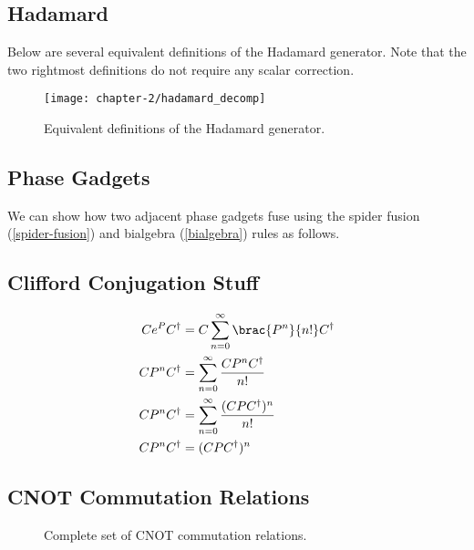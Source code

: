 \subsection{Hadamard}%
\label{appendix-hadamard}

Below are several equivalent definitions of the Hadamard generator. Note that the two rightmost definitions do not require any scalar correction.

\begin{figure}[H]
\centering
    \centering
    \texttt{[image: chapter-2/hadamard\_decomp]}
    \caption{Equivalent definitions of the Hadamard generator.}
\end{figure}


\subsection{Phase Gadgets}%
\label{appendix-phase-gadget-fusion}

We can show how two adjacent phase gadgets fuse using the spider fusion (\ref{spider-fusion}) and bialgebra (\ref{bialgebra}) rules as follows.

%


\subsection{Clifford Conjugation Stuff}%
\label{conjugation}

\begin{align*}
    Ce^PC^\dagger &= C \sum_{n=0}^\infty \brac{P^n}{n!} C^\dagger \\
    CP^nC^\dagger &= \sum_{n=0}^\infty \frac{C P^n C^\dagger}{n!} \\
    CP^nC^\dagger &= \sum_{n=0}^\infty \frac{(C P C^\dagger)^n}{n!} \\
    CP^nC^\dagger &= (CPC^\dagger)^n
\end{align*}


\subsection{CNOT Commutation Relations}

\begin{figure}[H]
    \centering
    \caption{Complete set of CNOT commutation relations.}
    \label{cnot_commutations}
\end{figure}
